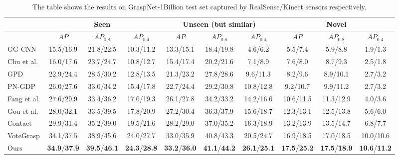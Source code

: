 \begin{table}[h]
\caption{The table shows the results on GraspNet-1Billion test set captured by RealSense/Kinect sensors respectively.}
\label{tab:grasp_detect_eval}
\begin{center}
\begin{tabular}{|l|c|c|c|c|c|c|c|c|c|}
\hline
& \multicolumn{3}{c|}{Seen} & \multicolumn{3}{c|}{Unseen (but similar)} & \multicolumn{3}{c|}{Novel} \\
\hline
& $AP$ & $AP_{0.8}$ & $AP_{0.4}$ & $AP$ & $AP_{0.8}$ & $AP_{0.4}$ & $AP$ & $AP_{0.8}$ & $AP_{0.4}$  \\
\hline
GG-CNN \cite{morrison2018closing} & 15.5/16.9 & 21.8/22.5 & 10.3/11.2 & 13.3/15.1 & 18.4/19.8 & 4.6/6.2 & 5.5/7.4 & 5.9/8.8 & 1.9/1.3 \\
\hline
Chu et al. \cite{chu2018real} & 16.0/17.6 & 23.7/24.7 & 10.8/12.7 & 15.4/17.4 & 20.2/21.6 & 7.1/8.9 & 7.6/8.0 & 8.7/9.3 & 2.5/1.8 \\
\hline
GPD \cite{ten2017grasp} & 22.9/24.4 & 28.5/30.2 & 12.8/13.5 & 21.3/23.2 & 27.8/28.6 & 9.6/11.3 & 8.2/9.6 & 8.9/10.1 & 2.7/3.2 \\
\hline
PN-GDP \cite{liang2019pointnetgpd} & 26.0/27.6 & 33.0/34.2 & 15.4/17.8 & 22.7/24.4 & 29.2/30.8 & 10.8/12.8 & 9.2/10.7 & 9.9/11.2 & 2.7/3.2 \\
\hline
Fang et al. \cite{fang2020graspnet} & 27.6/29.9 & 33.4/36.2 & 17.0/19.3 & 26.1/27.8 & 34.2/33.2 & 14.2/16.6 & 10.6/11.5 & 11.3/12.9 & 4.0/3.6 \\
\hline
Gou et al. \cite{gou2021rgb} & 28.0/32.1 & 33.5/39.5 & 17.8/20.9 & 27.2/30.4 & 36.3/37.9 & 15.6/18.7 & 12.3/13.1 & 12.5/13.8 & 5.6/6.0 \\
\hline
Contact \cite{sundermeyer2021contact} & 29.9/31.4 & 35.2/39.0 & 19.5/21.6 & 28.2/29.0 & 37.0/35.2 & 16.3/18.9 & 13.2/13.9 & 13.5/14.7 & 6.8/7.7 \\
\hline
VoteGrasp \cite{hoang2022context}  & 34.1/37.5 & 38.9/45.6 & 24.0/27.7 & 33.0/35.9 & 40.8/43.3 & 20.5/24.7 & 16.9/18.5 & 17.0/18.5 & 10.0/10.6 \\
\hline
Ours & \textbf{34.9}/\textbf{37.9} & \textbf{39.5}/\textbf{46.1} & \textbf{24.3}/\textbf{28.8} & \textbf{33.2}/\textbf{36.0} & \textbf{41.1}/\textbf{44.2} & \textbf{26.1}/\textbf{25.1} & \textbf{17.5}/\textbf{25.2} & \textbf{17.5}/\textbf{18.9} & \textbf{10.6}/\textbf{11.2} \\
\hline
\end{tabular}
\end{center}
\end{table}

